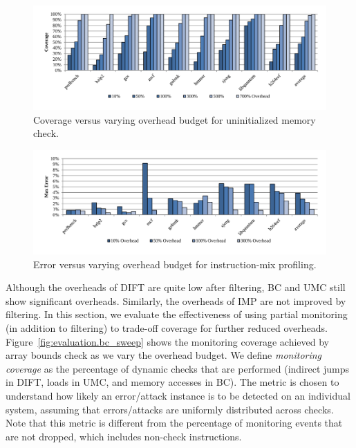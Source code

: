 \begin{figure}
  \begin{center}
    \includegraphics[width=\linewidth]{figs/data_umc_sweep.pdf}
    \vspace{-0.2in}
    \caption{Coverage versus varying overhead budget for uninitialized memory check.}
    \label{fig:evaluation.umc_sweep}
    \vspace{-0.1in}
  \end{center}
\end{figure}

\begin{figure}
  \begin{center}
    \includegraphics[width=\linewidth]{figs/data_imp_sweep.pdf}
    \vspace{-0.2in}
    \caption{Error versus varying overhead budget for instruction-mix profiling.}
    \label{fig:evaluation.imp_sweep}
    \vspace{-0.1in}
  \end{center}
\end{figure}

Although the overheads of DIFT are quite low after filtering, BC and UMC still
show significant overheads. Similarly, the overheads of IMP are not improved by filtering. In this section, we evaluate the effectiveness of
using partial monitoring (in addition to filtering) to trade-off coverage for further reduced overheads.
Figure~\ref{fig:evaluation.bc_sweep} shows the monitoring coverage achieved by
array bounds check as we vary the overhead budget. 
We define \emph{monitoring coverage} as the 
percentage of dynamic checks that are performed 
(indirect jumps in DIFT, loads in UMC, and memory accesses in BC). 
The metric is chosen to understand
how likely an error/attack instance is to be detected on an individual system, 
assuming that errors/attacks are uniformly distributed across checks. 
Note that this metric is different from the
percentage of monitoring events that are not dropped, which includes
non-check instructions.

